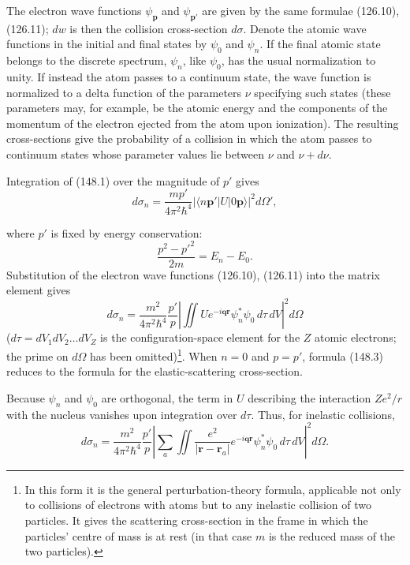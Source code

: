 The electron wave functions $\psi_{\mathbf p}$ and $\psi_{\mathbf p'}$ are
given by the same formulae (126.10), (126.11); $dw$ is then the collision
cross-section $d\sigma$. Denote the atomic wave functions in the initial and
final states by $\psi_0$ and $\psi_n$. If the final atomic state belongs to
the discrete spectrum, $\psi_n$, like $\psi_0$, has the usual normalization
to unity. If instead the atom passes to a continuum state, the wave function
is normalized to a delta function of the parameters $\nu$ specifying such
states (these parameters may, for example, be the atomic energy and the
components of the momentum of the electron ejected from the atom upon
ionization). The resulting cross-sections give the probability of a collision
in which the atom passes to continuum states whose parameter values lie
between $\nu$ and $\nu+d\nu$.

Integration of (148.1) over the magnitude of $p'$ gives
\[
 d\sigma_n=\frac{mp'}{4\pi^2\hbar^4}|\langle n\mathbf p'|U|0\mathbf p\rangle|^2d\Omega',
\]

where $p'$ is fixed by energy conservation:
\begin{equation}
 \frac{p^2-p'^2}{2m}=E_n-E_0.
 \tag{148.2}
\end{equation}
Substitution of the electron wave functions (126.10), (126.11) into the
matrix element gives
\begin{equation}
 d\sigma_n=\frac{m^2}{4\pi^2\hbar^4}\frac{p'}p
 \left|\iint Ue^{-i\mathbf q\mathbf r}\psi_n^*\psi_0\,d\tau\,dV\right|^2d\Omega
 \tag{148.3}
\end{equation}
($d\tau=dV_1dV_2\ldots dV_Z$ is the configuration-space element for the
$Z$ atomic electrons; the prime on $d\Omega$ has been omitted)\footnote{In
this form it is the general perturbation-theory formula, applicable not only
to collisions of electrons with atoms but to any inelastic collision of two
particles. It gives the scattering cross-section in the frame in which the
particles' centre of mass is at rest (in that case $m$ is the reduced mass of
the two particles).}. When $n=0$ and $p=p'$, formula (148.3) reduces to the
formula for the elastic-scattering cross-section.

Because $\psi_n$ and $\psi_0$ are orthogonal, the term in $U$ describing the
interaction $Ze^2/r$ with the nucleus vanishes upon integration over
$d\tau$. Thus, for inelastic collisions,
\begin{equation}
 d\sigma_n=\frac{m^2}{4\pi^2\hbar^4}\frac{p'}p
 \left|\sum_a\iint\frac{e^2}{|\mathbf r-\mathbf r_a|}e^{-i\mathbf q\mathbf r}
 \psi_n^*\psi_0\,d\tau\,dV\right|^2d\Omega.
 \tag{148.4}
\end{equation}

